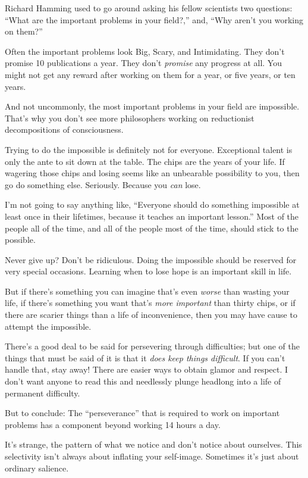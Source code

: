 {
 Richard Hamming used to go around asking his fellow scientists two
questions: ``What are the important problems in your
field?,'' and, ``Why
aren't you working on them?''}

{
 Often the important problems look Big, Scary, and Intimidating.
They don't promise 10 publications a year. They
don't \textit{promise} any progress at all. You might
not get any reward after working on them for a year, or five years, or
ten years.}

{
 And not uncommonly, the most important problems in your field are
impossible. That's why you don't see
more philosophers working on reductionist decompositions of
consciousness.}

{
 Trying to do the impossible is definitely not for everyone.
Exceptional talent is only the ante to sit down at the table. The chips
are the years of your life. If wagering those chips and losing seems
like an unbearable possibility to you, then go do something else.
Seriously. Because you \textit{can} lose.}

{
 I'm not going to say anything like,
``Everyone should do something impossible at least
once in their lifetimes, because it teaches an important
lesson.'' Most of the people all of the time, and all
of the people most of the time, should stick to the possible.}

{
 Never give up? Don't be ridiculous. Doing the
impossible should be reserved for very special occasions. Learning when
to lose hope is an important skill in life.}

{
 But if there's something you can imagine
that's even \textit{worse} than wasting your life, if
there's something you want that's
\textit{more important} than thirty chips, or if there are scarier
things than a life of inconvenience, then you may have cause to attempt
the impossible.}

{
 There's a good deal to be said for persevering
through difficulties; but one of the things that must be said of it is
that it \textit{does keep things difficult}. If you
can't handle that, stay away! There are easier ways to
obtain glamor and respect. I don't want anyone to read
this and needlessly plunge headlong into a life of permanent
difficulty.}

{
 But to conclude: The
``perseverance'' that is required to
work on important problems has a component beyond working 14 hours a
day.}

{
 It's strange, the pattern of what we notice and
don't notice about ourselves. This selectivity
isn't always about inflating your self-image. Sometimes
it's just about ordinary salience.}

